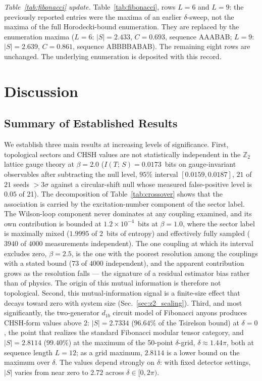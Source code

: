 \documentclass[aps,pra,twocolumn,superscriptaddress,showpacs,floatfix]{revtex4-2}
\newcommand{\Ztwo}{\mathbb{Z}_2}
\newcommand{\MI}{I(T;\,S)}
\begin{document}
\smallskip
\textit{Table~\ref{tab:fibonacci} update.}
Table~\ref{tab:fibonacci}, rows $L=6$ and $L=9$: the previously reported entries were the
maxima of an earlier $\delta$-sweep, not the maxima of the full
Horodecki-bound enumeration. They are replaced by the enumeration maxima
($L=6$: $|S|=2.433$, $C=0.693$, sequence AAABAB; $L=9$: $|S|=2.639$,
$C=0.861$, sequence ABBBBABAB). The remaining eight rows are unchanged.
The underlying enumeration is deposited with this record.

\section{Discussion}
\label{sec:discussion}

\subsection{Summary of Established Results}

We establish three main results at increasing levels of significance. First,
topological sectors and CHSH values are not statistically independent in the
$\Ztwo$ lattice gauge theory at $\beta = 2.0$ ($\MI = 0.0173$~bits on
gauge-invariant observables after subtracting the null level, $95\%$ interval
$[0.0159, 0.0187]$, $21$ of $21$
seeds ${>}3\sigma$ against a circular-shift null whose measured false-positive
level is $0.05$ of 21). The decomposition of Table~\ref{tab:crossover} shows
that the association is carried by the excitation-number component of the sector
label. The Wilson-loop component never dominates at any coupling examined, and
its own contribution is bounded at $1.2\times10^{-4}$~bits at $\beta = 1.0$,
where the sector label is maximally mixed ($1.9995$ of $2$~bits of entropy) and
effectively fully sampled ($3940$ of $4000$ measurements independent). The one
coupling at which its interval excludes zero, $\beta = 2.5$, is the one with the
poorest resolution among the couplings with a stated bound ($73$ of $4000$
independent), and the apparent
contribution grows as the resolution falls --- the signature of a residual
estimator bias rather than of physics. The origin of this mutual information is
therefore not topological. Second, this mutual-information signal is a
finite-size effect that decays toward zero with system size
(Sec.~\ref{sec:z2_scaling}). Third, and most significantly,
the two-generator $d_{1b}$ circuit model of Fibonacci anyons produces
CHSH-form values above 2: $|S| = 2.7334$ ($96.64\%$ of the Tsirelson bound) at
$\delta = 0$, the point that realizes the standard Fibonacci modular tensor
category, and $|S| = 2.8114$ ($99.40\%$) at the maximum of the 50-point
$\delta$-grid, $\delta \approx 1.44\pi$, both at sequence length $L = 12$; as
a grid maximum, $2.8114$ is a lower bound on the maximum over $\delta$. The
values depend strongly on $\delta$: with fixed detector settings, $|S|$ varies
from near zero to $2.72$ across $\delta \in [0, 2\pi)$.
\end{document}
